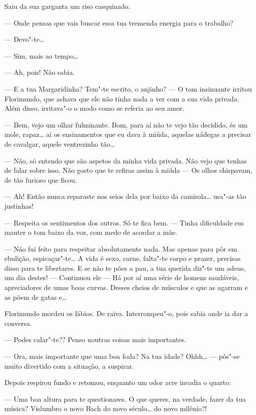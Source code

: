 Saiu da sua garganta um riso casquinado.

--- Onde pensas que vais buscar essa tua tremenda energia para o trabalho?

--- Devo"-te\ldots{}

--- Sim, mais ao tempo\ldots{}

--- Ah, pois! Não sabia.

--- E a tua Margaridinha? Tem"-te escrito, o anjinho? --- O tom insinuante
irritou Florimundo, que achava que ele não tinha nada a ver com a sua
vida privada. Além disso, irritava"-o o modo como se referia ao seu amor.

--- Bem, vejo um olhar fulminante. Bom, para aí não te vejo tão decidido,
és um mole, rapaz\ldots{} ai os ensinamentos que eu dava à miúda, aquelas
nádegas a precisar de cavalgar, aquele ventrezinho tão\ldots{}

--- Não, só entendo que são aspetos da minha vida privada. Não vejo que
tenhas de falar sobre isso. Não gosto que te refiras assim à miúda ---  Os
olhos chispavam, de tão furioso que ficou.

--- Ah! Então nunca reparaste nos seios dela por baixo da
camisola\ldots{} usa"-as tão justinhas!

--- Respeita os sentimentos dos outros. Só te fica bem. ---  Tinha
dificuldade em manter o tom baixo da voz, com medo de acordar a mãe.

--- Não fui feito para respeitar absolutamente nada. Mas apenas para pôr
em ebulição, espicaçar"-te\ldots{} A vida é sexo, carne, falta"-te corpo e
prazer, precisas disso para te libertares. E se não te pões a pau, a tua
querida diz"-te um adeus, um dia destes! --- Continuou ele --- Há por aí uma
série de homens saudáveis, apreciadores de umas boas curvas. Desses
cheios de músculos e que as agarram e as põem de gatas e\ldots{}

Florimundo mordeu os lábios. De raiva. Interrompeu"-o, pois sabia onde ia
dar a conversa.

--- Podes calar"-te?? Penso noutras coisas mais importantes.

--- Ora, mais importante que uma boa foda? Na tua idade? Ohhh\ldots{} --- 
pôs"-se muito divertido com a situação, a suspirar.

Depois respirou fundo e retomou, enquanto um odor acre invadia o quarto:

--- Uma boa altura para te questionares. O que queres, na verdade, fazer
da tua música? Vislumbro o novo Bach do novo século\ldots{} do novo milênio?!

